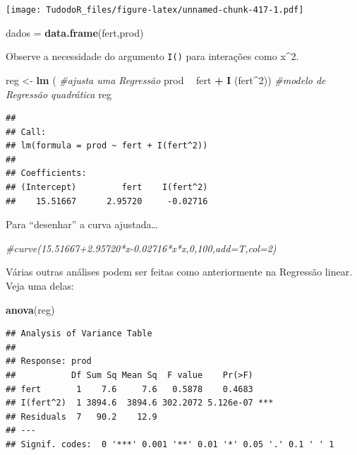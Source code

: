 \documentclass[
]{book}
\newenvironment{Shaded}{\begin{snugshade}}{\end{snugshade}}
\newcommand{\CommentTok}[1]{\textcolor[rgb]{0.56,0.35,0.01}{\textit{#1}}}
\newcommand{\DecValTok}[1]{\textcolor[rgb]{0.00,0.00,0.81}{#1}}
\newcommand{\KeywordTok}[1]{\textcolor[rgb]{0.13,0.29,0.53}{\textbf{#1}}}
\newcommand{\NormalTok}[1]{#1}
\newcommand{\OperatorTok}[1]{\textcolor[rgb]{0.81,0.36,0.00}{\textbf{#1}}}
\newcommand{\StringTok}[1]{\textcolor[rgb]{0.31,0.60,0.02}{#1}}
\begin{document}
\texttt{[image: TudodoR\_files/figure-latex/unnamed-chunk-417-1.pdf]}

\begin{Shaded}
\begin{Highlighting}[]
\NormalTok{dados =}\StringTok{ }\KeywordTok{data.frame}\NormalTok{(fert,prod)}
\end{Highlighting}
\end{Shaded}

Observe a necessidade do argumento \texttt{I()} para interações como x\^{}2.

\begin{Shaded}
\begin{Highlighting}[]
\NormalTok{reg <-}\StringTok{ }\KeywordTok{lm}\NormalTok{ ( }\CommentTok{#ajusta uma Regressão}
\NormalTok{        prod }\OperatorTok{~}\StringTok{ }\NormalTok{fert }\OperatorTok{+}\StringTok{ }\KeywordTok{I}\NormalTok{ (fert}\OperatorTok{^}\DecValTok{2}\NormalTok{)) }\CommentTok{#modelo de Regressão quadrática}
\NormalTok{reg}
\end{Highlighting}
\end{Shaded}

\begin{verbatim}
## 
## Call:
## lm(formula = prod ~ fert + I(fert^2))
## 
## Coefficients:
## (Intercept)         fert    I(fert^2)  
##    15.51667      2.95720     -0.02716
\end{verbatim}

Para ``desenhar'' a curva ajustada\ldots{}

\begin{Shaded}
\begin{Highlighting}[]
\CommentTok{#curve(15.51667+2.95720*x-0.02716*x*x,0,100,add=T,col=2)}
\end{Highlighting}
\end{Shaded}

Várias outras análises podem ser feitas como anteriormente na Regressão linear. Veja uma delas:

\begin{Shaded}
\begin{Highlighting}[]
 \KeywordTok{anova}\NormalTok{(reg)}
\end{Highlighting}
\end{Shaded}

\begin{verbatim}
## Analysis of Variance Table
## 
## Response: prod
##           Df Sum Sq Mean Sq  F value    Pr(>F)    
## fert       1    7.6     7.6   0.5878    0.4683    
## I(fert^2)  1 3894.6  3894.6 302.2072 5.126e-07 ***
## Residuals  7   90.2    12.9                       
## ---
## Signif. codes:  0 '***' 0.001 '**' 0.01 '*' 0.05 '.' 0.1 ' ' 1
\end{verbatim}
\end{document}
